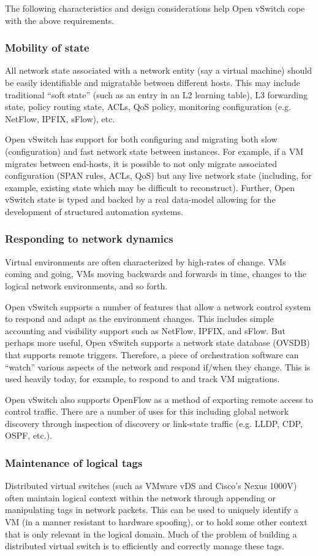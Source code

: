 \documentclass[../sn.tex]{subfiles}
\begin{document}
The following characteristics and design considerations help Open vSwitch cope with the 
above requirements.

\subsubsection{Mobility of state}
All network state associated with a network entity (say a virtual machine) should be easily 
identifiable and migratable between different hosts. This may include traditional “soft state” 
(such as an entry in an L2 learning table), L3 forwarding state, policy routing state, ACLs, 
QoS policy, monitoring configuration (e.g. NetFlow, IPFIX, sFlow), etc.

Open vSwitch has support for both configuring and migrating both slow (configuration) and fast 
network state between instances. For example, if a VM migrates between end-hosts, it is possible 
to not only migrate associated configuration (SPAN rules, ACLs, QoS) but any live network state 
(including, for example, existing state which may be difficult to reconstruct). Further, Open 
vSwitch state is typed and backed by a real data-model allowing for the development of structured 
automation systems.

\subsubsection{Responding to network dynamics}
Virtual environments are often characterized by high-rates of change. VMs coming and going, VMs 
moving backwards and forwards in time, changes to the logical network environments, and so forth.

Open vSwitch supports a number of features that allow a network control system to respond and adapt 
as the environment changes. This includes simple accounting and visibility support such as NetFlow, 
IPFIX, and sFlow. But perhaps more useful, Open vSwitch supports a network state database (OVSDB) 
that supports remote triggers. Therefore, a piece of orchestration software can “watch” various aspects 
of the network and respond if/when they change. This is used heavily today, for example, to respond to 
and track VM migrations.

Open vSwitch also supports OpenFlow as a method of exporting remote access to control traffic. There are 
a number of uses for this including global network discovery through inspection of discovery or link-state 
traffic (e.g. LLDP, CDP, OSPF, etc.).

\subsubsection{Maintenance of logical tags}
Distributed virtual switches (such as VMware vDS and Cisco’s Nexus 1000V) often maintain logical context 
within the network through appending or manipulating tags in network packets. This can be used to uniquely 
identify a VM (in a manner resistant to hardware spoofing), or to hold some other context that is only 
relevant in the logical domain. Much of the problem of building a distributed virtual switch is to 
efficiently and correctly manage these tags.
\end{document}
